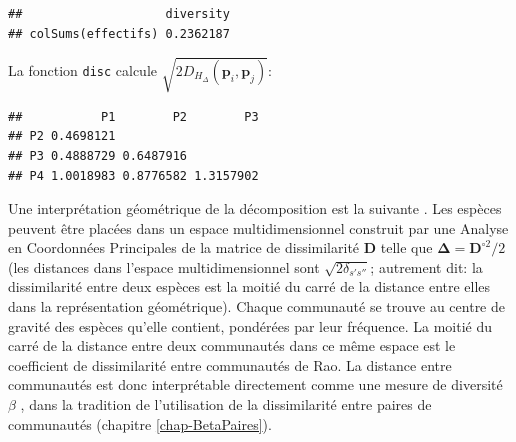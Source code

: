 \documentclass[
  11pt,
  french,
  a4paper,
  extrafontsizes,onecolumn,openright
  ]{memoir}
\newenvironment{Shaded}{\begin{snugshade}}{\end{snugshade}}
\newcommand{\KeywordTok}[1]{\textcolor[rgb]{0.13,0.29,0.53}{\textbf{#1}}}
\newcommand{\NormalTok}[1]{#1}
\newcommand{\OperatorTok}[1]{\textcolor[rgb]{0.81,0.36,0.00}{\textbf{#1}}}
\begin{document}
\scriptsize

\begin{Shaded}
\end{Shaded}

\begin{verbatim}
##                    diversity
## colSums(effectifs) 0.2362187
\end{verbatim}

\normalsize

La fonction \texttt{disc} calcule \(\sqrt{2D_{H_{\Delta}}\left({\mathbf{p}}_i,{\mathbf{p}}_j\right)}\):

\scriptsize

\begin{Shaded}
\end{Shaded}

\begin{verbatim}
##           P1        P2        P3
## P2 0.4698121                    
## P3 0.4888729 0.6487916          
## P4 1.0018983 0.8776582 1.3157902
\end{verbatim}

\normalsize

Une interprétation géométrique de la décomposition est la suivante \autocite{Pavoine2004}.
Les espèces peuvent être placées dans un espace multidimensionnel construit par une Analyse en Coordonnées Principales \autocite{Gower1966} de la matrice de dissimilarité \(\mathbf{D}\) telle que \(\mathbf{\Delta}={\mathbf{D}^{\circ2}}/{2}\) (les distances dans l'espace multidimensionnel sont \(\sqrt{2\delta_{s's''}}\); autrement dit: la dissimilarité entre deux espèces est la moitié du carré de la distance entre elles dans la représentation géométrique).
Chaque communauté se trouve au centre de gravité des espèces qu'elle contient, pondérées par leur fréquence.
La moitié du carré de la distance entre deux communautés dans ce même espace est le coefficient de dissimilarité entre communautés de Rao.
La distance entre communautés est donc interprétable directement comme une mesure de diversité \(\beta\) \autocite{Ricotta2015}, dans la tradition de l'utilisation de la dissimilarité entre paires de communautés (chapitre \ref{chap-BetaPaires}).
\end{document}
